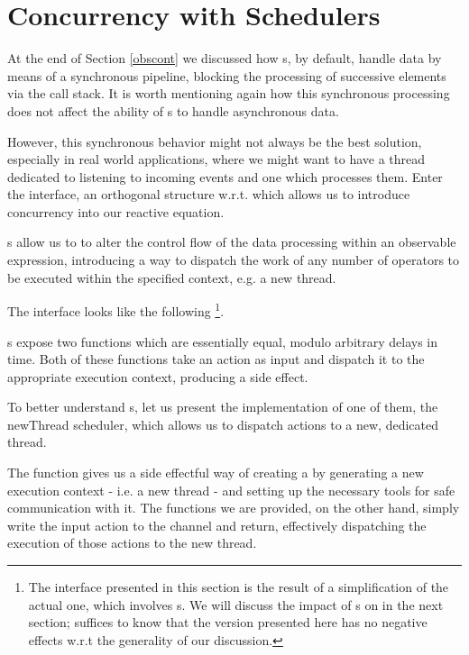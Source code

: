 \section{Concurrency with Schedulers}
\label{schedulers}

At the end of Section \ref{obscont} we discussed how s, by default, handle data by means of a synchronous pipeline, blocking the processing of successive elements via the call stack. It is worth mentioning again how this synchronous processing does not affect the ability of s to handle asynchronous data.

However, this synchronous behavior might not always be the best solution, especially in real world applications, where we might want to have a thread dedicated to listening to incoming events and one which processes them. Enter the  interface, an orthogonal\cite{wiki:orthogonality} structure w.r.t.  which allows us to introduce concurrency into our reactive equation. 

s allow us to to alter the control flow of the data processing within an observable expression, introducing a way to dispatch the work of any number of operators to be executed within the specified context, e.g. a new thread.

The  interface looks like the following \footnote{The interface presented in this section is the result of a simplification of the actual one, which involves s. We will discuss the impact of s on  in the next section; suffices to know that the version presented here has no negative effects w.r.t the generality of our discussion.}.


s expose two functions which are essentially equal, modulo arbitrary delays in time. Both of these functions take an  action as input and dispatch it to the appropriate execution context, producing a side effect. 

To better understand s, let us present the implementation of one of them, the newThread scheduler, which allows us to dispatch actions to a new, dedicated thread.


The  function gives us a side effectful way of creating a  by generating a new execution context - i.e. a new thread - and setting up the necessary tools for safe communication with it. The  functions we are provided, on the other hand, simply write the input  action to the channel and return, effectively dispatching the execution of those actions to the new thread. 

